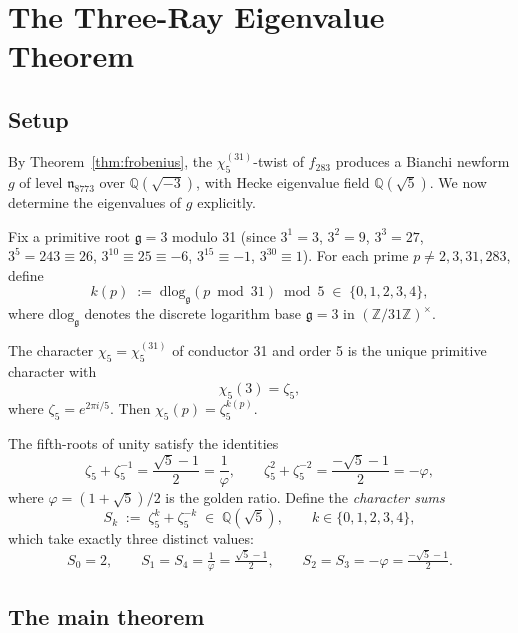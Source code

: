 
\section{The Three-Ray Eigenvalue Theorem}
\label{sec:three-ray}

\subsection{Setup}
\label{subsec:three-ray-setup}

By Theorem~\ref{thm:frobenius}, the $\chi_5^{(31)}$-twist of $f_{283}$
produces a Bianchi newform $g$ of level $\mathfrak{n}_{8773}$ over
$\mathbb{Q}(\sqrt{-3})$, with Hecke eigenvalue field $\mathbb{Q}(\sqrt{5})$.
We now determine the eigenvalues of $g$ explicitly.

Fix a primitive root $\mathfrak{g} = 3$ modulo 31
(since $3^1 = 3$, $3^2 = 9$, $3^3 = 27$, $3^5 = 243 \equiv 26$,
$3^{10} \equiv 25 \equiv -6$, $3^{15} \equiv -1$, $3^{30} \equiv 1$).
For each prime $p \neq 2, 3, 31, 283$, define
\[
  k(p) \;:=\; \mathrm{dlog}_{\mathfrak{g}}(p \bmod 31) \bmod 5
  \;\in\; \{0,1,2,3,4\},
\]
where $\mathrm{dlog}_{\mathfrak{g}}$ denotes the discrete logarithm base
$\mathfrak{g} = 3$ in $(\mathbb{Z}/31\mathbb{Z})^\times$.

The character $\chi_5 = \chi_5^{(31)}$ of conductor 31 and order 5 is
the unique primitive character with
\[
  \chi_5(3) = \zeta_5,
\]
where $\zeta_5 = e^{2\pi i/5}$. Then $\chi_5(p) = \zeta_5^{k(p)}$.

The fifth-roots of unity satisfy the identities
\[
  \zeta_5 + \zeta_5^{-1} = \frac{\sqrt{5}-1}{2} = \frac{1}{\varphi},
  \qquad
  \zeta_5^2 + \zeta_5^{-2} = \frac{-\sqrt{5}-1}{2} = -\varphi,
\]
where $\varphi = (1+\sqrt{5})/2$ is the golden ratio.
Define the \emph{character sums}
\begin{equation}
\label{eq:Sk}
  S_k \;:=\; \zeta_5^k + \zeta_5^{-k} \;\in\; \mathbb{Q}(\sqrt{5}),
  \qquad k \in \{0,1,2,3,4\},
\end{equation}
which take exactly three distinct values:
\[
  S_0 = 2, \qquad
  S_1 = S_4 = \tfrac{1}{\varphi} = \tfrac{\sqrt{5}-1}{2}, \qquad
  S_2 = S_3 = -\varphi = \tfrac{-\sqrt{5}-1}{2}.
\]

\subsection{The main theorem}
\label{subsec:three-ray-thm}

